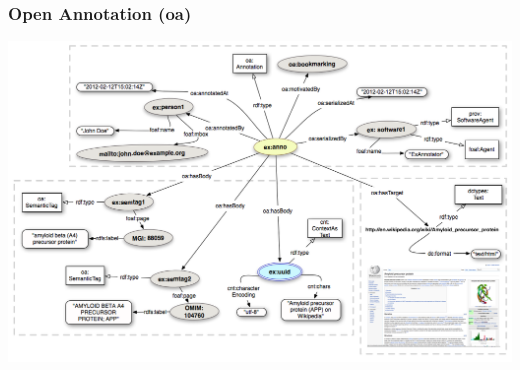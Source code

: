 \documentclass[10pt]{beamer}
\begin{document}
\begin{frame}
  \frametitle{Open Annotation (oa)}
\begin{adjustwidth}{-3em}{-3em}
  \centering
  \includegraphics[width=1\linewidth]{Open-Annotation_CB_Bookmarking_and_Semantically_Tagging_A_webpage_spec20130128.png}
\end{adjustwidth}

\end{frame}
\end{document}
